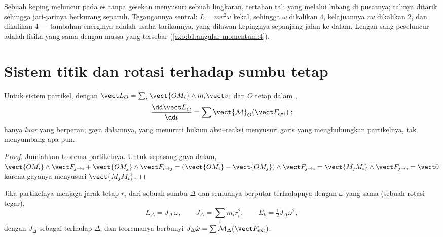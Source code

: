 \begin{example}\label{ex:b1:angular-momentum:puck}
Sebuah keping meluncur pada es tanpa gesekan menyusuri sebuah
lingkaran, tertahan tali yang melalui lubang di pusatnya; talinya
ditarik sehingga jari-jarinya berkurang separuh. Tegangannya sentral:
$L = mr^2\omega$ kekal, sehingga $\omega$ dikalikan $4$, kelajuannya
$r\omega$ dikalikan $2$, dan  dikalikan $4$ ---
tambahan energinya adalah usaha tarikannya, yang dilawan kepingnya
sepanjang jalan ke dalam. Lengan sang peseluncur adalah fisika yang sama
dengan massa yang tersebar (\cref{exo:b1:angular-momentum:4}).
\end{example}

\section{Sistem titik dan rotasi terhadap sumbu tetap}

\begin{theorem}\label{thm:b1:angular-momentum:system}
Untuk sistem partikel, dengan $\vect L_O = \sum_i\vect{OM_i}\wedge m_i\vect v_i$
dan $O$ tetap dalam ,
\[
\frac{\dd\vect L_O}{\dd t} = \sum\vect{\mathcal M}_O(\vect F_{\mathrm{ext}}):
\]
hanya  \emph{luar} yang berperan; gaya dalamnya, yang menuruti
hukum aksi--reaksi menyusuri garis yang menghubungkan partikelnya, tak
menyumbang apa pun.
\end{theorem}

\begin{proof}
Jumlahkan teorema partikelnya. Untuk sepasang gaya dalam,
$\vect{OM_i}\wedge\vect F_{j\to i}
+ \vect{OM_j}\wedge\vect F_{i\to j} = (\vect{OM_i} - \vect{OM_j})\wedge\vect F_{j\to i}
= \vect{M_jM_i}\wedge\vect F_{j\to i} = \vect 0$ karena gayanya menyusuri
$\vect{M_jM_i}$.
\end{proof}

\begin{proposition}\label{prop:b1:angular-momentum:inertia}
Jika partikelnya menjaga jarak tetap $r_i$ dari sebuah sumbu $\Delta$
dan semuanya berputar terhadapnya dengan  $\omega$ yang
sama (sebuah rotasi tegar),
\[
L_\Delta = J_\Delta\,\omega, \qquad J_\Delta = \sum_i m_ir_i^2, \qquad
E_k = \tfrac12 J_\Delta\omega^2,
\]
dengan $J_\Delta$ sebagai \emph{} terhadap $\Delta$, dan
teoremanya berbunyi $J_\Delta\dot\omega = \sum\mathcal M_\Delta(\vect F_{\mathrm{ext}})$.
\end{proposition}

